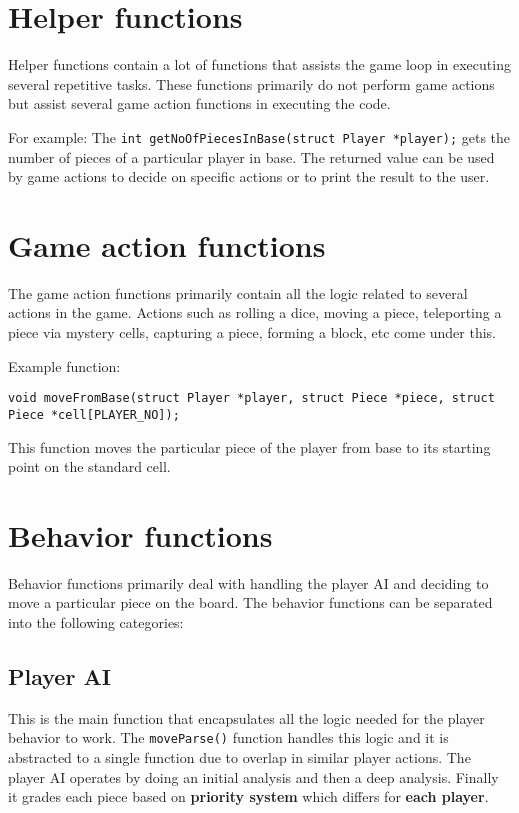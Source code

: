 \documentclass[12pt, a4paper]{report}
\begin{document}
\section{Helper functions}
Helper functions contain a lot of functions that assists the game loop in  executing several repetitive tasks. These functions primarily do not perform game actions but assist several game action functions in executing the code. 

For example: The \lstinline|int getNoOfPiecesInBase(struct Player *player);| gets the number of pieces of a particular player in base. The returned value can be used by game actions to decide on specific actions or to print the result to the user.

\section{Game action functions}
The game action functions primarily contain all the logic related to several actions in the game. Actions such as rolling a dice, moving a piece, teleporting a piece via mystery cells, capturing a piece, forming a block, etc come under this. 

Example function:

 \lstinline|void moveFromBase(struct Player *player, struct Piece *piece, struct Piece *cell[PLAYER_NO]);| 

This function moves the particular piece of the player from base to its starting point on the standard cell.


\section{Behavior functions}
Behavior functions primarily deal with handling the player AI and deciding to move a particular piece on the board. The behavior functions can be separated into the following categories:

\subsection{Player AI}
This is the main function that encapsulates all the logic needed for the player behavior to work. The \lstinline|moveParse()| function handles this logic and it is abstracted to a single function due to overlap in similar player actions. The player AI operates by doing an initial analysis and then a deep analysis. Finally it grades each piece based on \textbf{priority system} which differs for \textbf{each player}.
\end{document}

